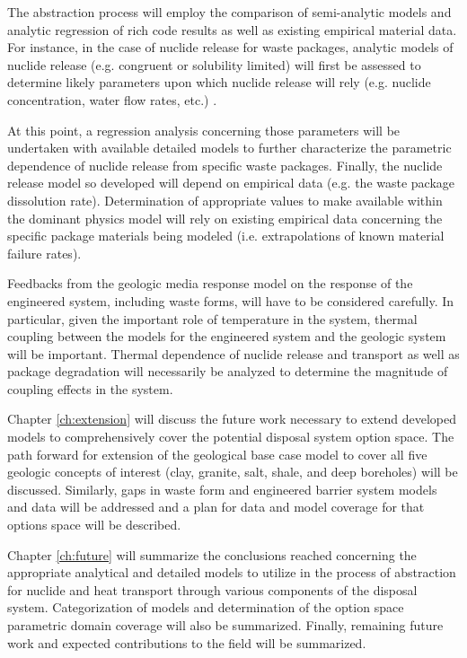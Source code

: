 The abstraction process will employ the comparison of semi-analytic 
models and analytic regression of rich code results as well as 
existing empirical material data. For instance, in the case of nuclide 
release for waste packages, analytic models of nuclide release (e.g. 
congruent or solubility limited) will first be assessed to determine 
likely parameters upon which nuclide release will rely (e.g. nuclide 
concentration, water flow rates, etc.) \cite{ahn_congruent}. 

At this point, a regression analysis concerning those parameters will 
be undertaken with available detailed models to further characterize 
the parametric dependence of nuclide release from specific waste 
packages.  Finally, the nuclide release model so developed will depend 
on empirical data (e.g. the waste package dissolution rate). 
Determination of appropriate values to make available within the 
dominant physics model will rely on existing empirical data concerning 
the specific package materials being modeled (i.e.  extrapolations of 
known material failure rates).  

Feedbacks from the geologic media response model on the response of 
the engineered system, including waste forms, will have to be 
considered carefully.  In particular, given the important role of 
temperature in the system, thermal coupling between the models for the 
engineered system and the geologic system will be important. Thermal 
dependence of nuclide release and transport as well as package 
degradation will necessarily be analyzed to determine the magnitude of 
coupling effects in the system.

Chapter \ref{ch:extension} will discuss the future work necessary to 
extend developed models to comprehensively cover the potential 
disposal system option space. The path forward for extension of the 
geological base case model to cover all five geologic concepts of 
interest (clay, granite, salt, shale, and deep boreholes) will be 
discussed. Similarly, gaps in waste form and engineered barrier system 
models and data will be addressed and a plan for data and model 
coverage for that options space will be described.

Chapter \ref{ch:future} will summarize the conclusions reached 
concerning the appropriate analytical and detailed models to utilize 
in the process of abstraction for nuclide and heat transport through 
various components of the disposal system. Categorization of models 
and determination of the option space parametric domain coverage will 
also be summarized. Finally, remaining future work and expected 
contributions to the field will be summarized. 
